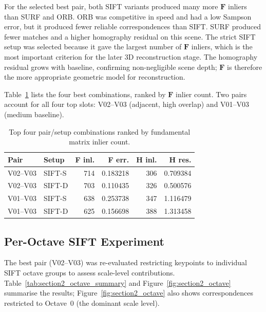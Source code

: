 \documentclass[11pt,a4paper]{article}
\begin{document}
For the selected best pair, both SIFT variants produced many more
$\mathbf{F}$ inliers than SURF and ORB.  ORB was competitive in speed and had a
low Sampson error, but it produced fewer reliable correspondences than SIFT.
SURF produced fewer matches and a higher homography residual on this scene.  The
strict SIFT setup was selected because it gave the largest number of
$\mathbf{F}$ inliers, which is the most important criterion for the later 3D
reconstruction stage.  The homography residual grows with baseline, confirming
non-negligible scene depth; $\mathbf{F}$ is therefore the more appropriate
geometric model for reconstruction.

Table~\ref{tab:section2_top_combinations} lists the four best combinations, ranked by
$\mathbf{F}$ inlier count.  Two pairs account for all four top slots:
V02--V03 (adjacent, high overlap) and V01--V03 (medium baseline).

\begin{table}[htbp]
\centering
\caption{Top four pair/setup combinations ranked by fundamental matrix inlier count.}
\label{tab:section2_top_combinations}
\begin{tabular}{llrrrr}
\hline
Pair     & Setup  & {F inl.} & {F err.} & {H inl.} & {H res.} \\
\hline
V02--V03 & SIFT-S & 714 & 0.183218 & 306 & 0.709384 \\
V02--V03 & SIFT-D & 703 & 0.110435 & 326 & 0.500576 \\
V01--V03 & SIFT-S & 638 & 0.253738 & 347 & 1.116479 \\
V01--V03 & SIFT-D & 625 & 0.156698 & 388 & 1.313458 \\
\hline
\end{tabular}
\end{table}

\subsection{Per-Octave SIFT Experiment}
\label{sec:sec2_octave}

The best pair (V02--V03) was re-evaluated restricting keypoints to individual SIFT octave
groups to assess scale-level contributions.
Table~\ref{tab:section2_octave_summary} and Figure~\ref{fig:section2_octave} summarise
the results; Figure~\ref{fig:section2_octave} also shows correspondences restricted to
Octave~0 (the dominant scale level).
\end{document}
